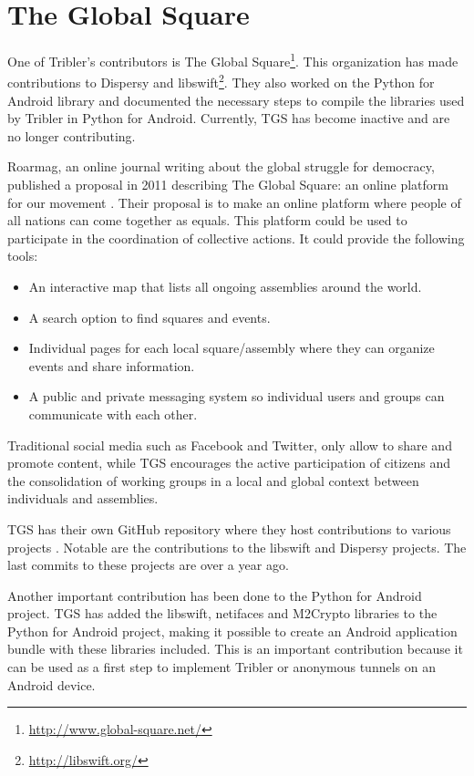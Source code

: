 \section{The Global Square}
	\label{sec:tgs}
	One of Tribler's contributors is The Global Square\footnote{\url{http://www.global-square.net/}}. This organization has made contributions to Dispersy and libswift\footnote{\url{http://libswift.org/}}. They also worked on the Python for Android library and documented the necessary steps to compile the libraries used by Tribler in Python for Android. Currently, TGS has become inactive and are no longer contributing.
	
	Roarmag, an online journal writing about the global struggle for democracy, published a proposal in 2011 describing The Global Square: an online platform for our movement \cite{theglobalsquare}. Their proposal is to make an online platform where people of all nations can come together as equals. This platform could be used to participate in the coordination of collective actions. It could provide the following tools:
	\begin{itemize}
		\item An interactive map that lists all ongoing assemblies around the world.
		\item A search option to find squares and events.
		\item Individual pages for each local square/assembly where they can organize events and share information.
		\item A public and private messaging system so individual users and groups can communicate with each other.
	\end{itemize}
	Traditional social media such as Facebook and Twitter, only allow to share and promote content, while TGS encourages the active participation of citizens and the consolidation of working groups in a local and global context between individuals and assemblies.
	
	TGS has their own GitHub repository where they host contributions to various projects \cite{theglobalsquaregithub}. Notable are the contributions to the libswift and Dispersy projects. The last commits to these projects are over a year ago.
		
	Another important contribution has been done to the Python for Android project. TGS has added the libswift, netifaces and M2Crypto libraries to the Python for Android project, making it possible to create an Android application bundle with these libraries included. This is an important contribution because it can be used as a first step to implement Tribler or anonymous tunnels on an Android device.

